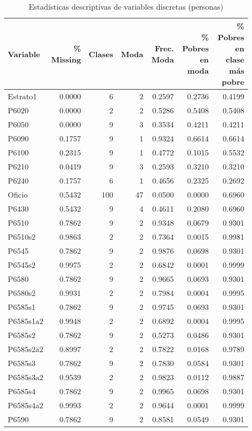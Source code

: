 \begin{table}[H]
\centering
\caption{Estadísticas descriptivas de variables discretas (personas)}
\label{tab:02_descriptiva_personas_discreta}
\begin{tabular}{lrrrrrr}
\toprule
Variable & \% Missing & Clases & Moda & Frec. Moda & \% Pobres en moda & \% Pobres en clase más pobre \\
\midrule
Estrato1 & 0.0000 & 6 & 2 & 0.2597 & 0.2736 & 0.4199 \\
P6020 & 0.0000 & 2 & 2 & 0.5286 & 0.5408 & 0.5408 \\
P6050 & 0.0000 & 9 & 3 & 0.3534 & 0.4211 & 0.4211 \\
P6090 & 0.1757 & 9 & 1 & 0.9324 & 0.6614 & 0.6614 \\
P6100 & 0.2315 & 9 & 1 & 0.4772 & 0.1015 & 0.5532 \\
P6210 & 0.0419 & 9 & 3 & 0.2593 & 0.3210 & 0.3210 \\
P6240 & 0.1757 & 6 & 1 & 0.4656 & 0.2325 & 0.2692 \\
Oficio & 0.5432 & 100 & 47 & 0.0500 & 0.0000 & 0.6960 \\
P6430 & 0.5432 & 9 & 4 & 0.4611 & 0.2080 & 0.6960 \\
P6510 & 0.7862 & 9 & 2 & 0.9348 & 0.0679 & 0.9301 \\
P6510s2 & 0.9863 & 2 & 2 & 0.7364 & 0.0015 & 0.9981 \\
P6545 & 0.7862 & 9 & 2 & 0.9876 & 0.0698 & 0.9301 \\
P6545s2 & 0.9975 & 2 & 2 & 0.6842 & 0.0001 & 0.9999 \\
P6580 & 0.7862 & 9 & 2 & 0.9665 & 0.0693 & 0.9301 \\
P6580s2 & 0.9931 & 2 & 2 & 0.7984 & 0.0004 & 0.9995 \\
P6585s1 & 0.7862 & 9 & 2 & 0.9745 & 0.0693 & 0.9301 \\
P6585s1a2 & 0.9948 & 2 & 2 & 0.6892 & 0.0004 & 0.9995 \\
P6585s2 & 0.7862 & 9 & 2 & 0.5273 & 0.0486 & 0.9301 \\
P6585s2a2 & 0.8997 & 2 & 2 & 0.7822 & 0.0168 & 0.9789 \\
P6585s3 & 0.7862 & 9 & 2 & 0.7830 & 0.0584 & 0.9301 \\
P6585s3a2 & 0.9539 & 2 & 2 & 0.9823 & 0.0112 & 0.9887 \\
P6585s4 & 0.7862 & 9 & 2 & 0.9965 & 0.0698 & 0.9301 \\
P6585s4a2 & 0.9993 & 2 & 2 & 0.9644 & 0.0001 & 0.9999 \\
P6590 & 0.7862 & 9 & 2 & 0.8581 & 0.0549 & 0.9301 \\

\end{tabular}
\end{table}
